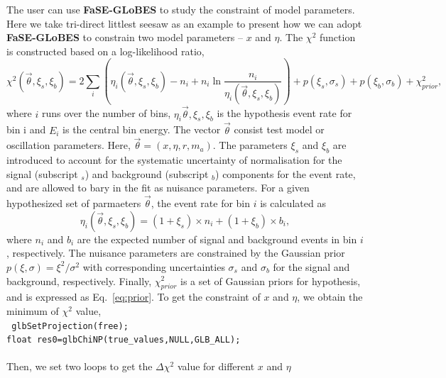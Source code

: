 \documentclass[aps,prd,nofootinbib,preprint]{revtex4}
\begin{document}
The user can use \textbf{FaSE-GLoBES} to study the constraint of model parameters. Here we take tri-direct littlest seesaw as an example to present how we can adopt \textbf{FaSE-GLoBES} to constrain two model parameters -- $x$ and $\eta$. 
The $\chi^2$ function is constructed based on a log-likelihood ratio,
\begin{equation}\label{eq:chi-squared}
\chi^2(\vec{\theta},\xi_s,\xi_b)=2\sum_i\left(\eta_i(\vec{\theta},\xi_s,\xi_b)-n_i+n_i\ln\frac{n_i}{\eta_i(\vec{\theta},\xi_s,\xi_b)} \right)+p(\xi_s,\sigma_s)+p(\xi_b,\sigma_b)+\chi^2_{prior},
\end{equation}
where $i$ runs over the number of bins, $\eta_i{\vec{\theta},\xi_s,\xi_b}$ is the hypothesis event rate for bin i and $E_i$ is the central bin energy. The vector $\vec{\theta}$ consist test model or oscillation parameters. Here, $\vec{\theta}=(x,\eta,r,m_a)$. The parameters $\xi_s$ and $\xi_b$ are introduced to account for the systematic uncertainty of normalisation for the signal (subscript $_s$) and background (subscript $_b$) components for the event rate, and are allowed to bary in the fit as nuisance parameters. For a given hypothesized set of parmaeters $\vec{\theta}$, the event rate for bin $i$ is calculated as\\
\begin{equation}
\eta_i(\vec{\theta},\xi_s,\xi_b)=(1+\xi_s)\times n_i+(1+\xi_b)\times b_i,
\end{equation}
where $n_i$ and $b_i$ are the expected number of signal and background events in bin $i$, respectively. The nuisance parameters are constrained by the Gaussian prior $p(\xi,\sigma)=\xi^2/\sigma^2$ with corresponding uncertainties $\sigma_s$ and $\sigma_b$ for the signal and background, respectively. Finally, $\chi^2_{prior}$ is a set of Gaussian priors for hypothesis, and is expressed as Eq.~\ref{eq:prior}. 
To get the constraint of $x$ and $\eta$, we obtain the minimum of $\chi^2$ value,\vspace{0.2cm}\\
\texttt{
    glbSetProjection(free);\\
    float res0=glbChiNP(true\_values,NULL,GLB\_ALL);\\ } \vspace{0.2cm}\\
%
Then, we set two loops to get the $\Delta \chi^2$ value for different $x$ and $\eta$\vspace{0.2cm}\\
%
\end{document}
